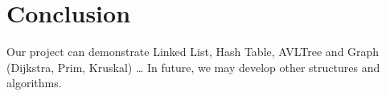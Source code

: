 \section{Conclusion}
Our project can demonstrate Linked List, Hash Table, AVLTree and Graph (Dijkstra, Prim, Kruskal) … In future, we may develop other structures and algorithms.
